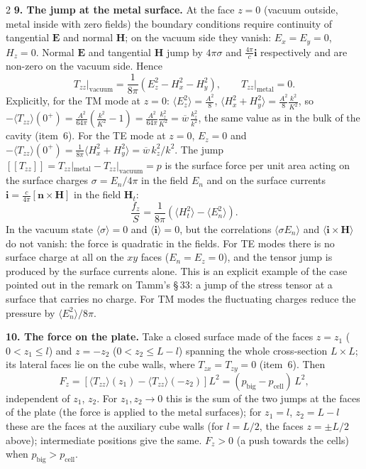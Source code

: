 \documentclass[twoside, 10pt]{article}
\begin{document}
\begin{multicols}{2}
\textbf{9. The jump at the metal surface.} At the face $z=0$ (vacuum outside, metal
inside with zero fields) the boundary conditions require continuity of tangential
$\mathbf E$ and normal $\mathbf H$; on the vacuum side they vanish: $E_x=E_y=0$,
$H_z=0$. Normal $\mathbf E$ and tangential $\mathbf H$ jump by $4\pi\sigma$ and
$\frac{4\pi}{c}\mathbf i$ respectively and are non-zero on the vacuum side. Hence
\[
T_{zz}\big|_{\text{vacuum}}=\frac1{8\pi}\left(E_z^2-H_x^2-H_y^2\right),\qquad
T_{zz}\big|_{\text{metal}}=0 .
\]
Explicitly, for the TM mode at $z=0$: $\langle E_z^2\rangle=\frac{A^2}{8}$,
$\langle H_x^2+H_y^2\rangle=\frac{A^2}{8}\frac{k^2}{K^2}$, so
$-\langle T_{zz}\rangle(0^+)=\frac{A^2}{64\pi}\left(\frac{k^2}{K^2}-1\right)=\frac{A^2}{64\pi}\frac{k_z^2}{K^2}=\overline w\,\frac{k_z^2}{k^2}$,
the same value as in the bulk of the cavity (item~6). For the TE mode at $z=0$,
$E_z=0$ and $-\langle T_{zz}\rangle(0^+)=\frac1{8\pi}\langle H_x^2+H_y^2\rangle=\overline w\,k_z^2/k^2$.
The jump $[\![T_{zz}]\!]=T_{zz}|_{\text{metal}}-T_{zz}|_{\text{vacuum}}=p$ is the surface
force per unit area acting on the surface charges $\sigma=E_n/4\pi$ in the field
$E_n$ and on the surface currents $\mathbf i=\frac{c}{4\pi}[\mathbf n\times\mathbf H]$ in
the field $\mathbf H_t$:
\[
\frac{f_z}{S}=\frac1{8\pi}\left(\langle H_t^2\rangle-\langle E_n^2\rangle\right).
\]
In the vacuum state $\langle\sigma\rangle=0$ and $\langle\mathbf i\rangle=0$, but the
correlations $\langle\sigma E_n\rangle$ and $\langle\mathbf i\times\mathbf H\rangle$ do not
vanish: the force is quadratic in the fields. For TE modes there is no surface
charge at all on the $xy$ faces ($E_n=E_z=0$), and the tensor jump is produced by the
surface currents alone. This is an explicit example of the case pointed out in the
remark on Tamm's \S\,33: a jump of the stress tensor at a surface that carries no
charge. For TM modes the fluctuating charges reduce the pressure by
$\langle E_n^2\rangle/8\pi$.

\textbf{10. The force on the plate.} Take a closed surface made of the faces $z=z_1$
($0<z_1\le l$) and $z=-z_2$ ($0<z_2\le L-l$) spanning the whole cross-section
$L\times L$; its lateral faces lie on the cube walls, where $T_{zx}=T_{zy}=0$
(item~6). Then
\[
F_z=\left[\langle T_{zz}\rangle(z_1)-\langle T_{zz}\rangle(-z_2)\right]L^2=(p_{\text{big}}-p_{\text{cell}})\,L^2,
\]
independent of $z_1$, $z_2$. For $z_1,z_2\to0$ this is the sum of the two jumps at
the faces of the plate (the force is applied to the metal surfaces); for $z_1=l$,
$z_2=L-l$ these are the faces at the auxiliary cube walls (for $l=L/2$, the faces
$z=\pm L/2$ above); intermediate positions give the same. $F_z>0$ (a push towards
the cells) when $p_{\text{big}}>p_{\text{cell}}$.


\end{multicols}
\end{document}
